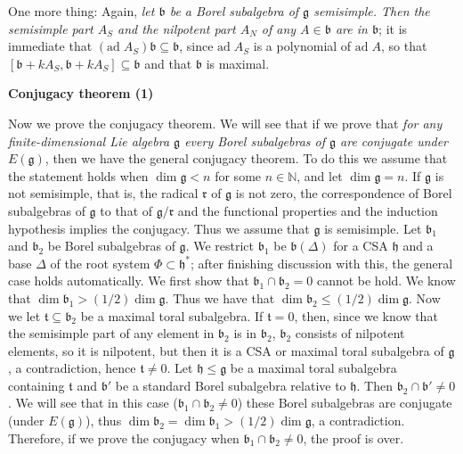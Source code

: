 \documentclass{article}
\newcommand{\NaN}{\mathbb{N}}
\newcommand{\lie}[1]{\mathfrak{#1}}
\newcommand{\ad}[1]{\mathrm{ad}\; #1}
\begin{document}
One more thing:
Again, \textit{let $\lie{b}$ be a Borel subalgebra of $\lie{g}$ semisimple.
Then the semisimple part $A_S$ and the nilpotent part $A_N$ of any $A \in \lie{b}$ are in $\lie{b}$}; it is immediate that $(\ad{A_S})\lie{b} \subseteq \lie{b}$, since $\ad{A_S}$ is a polynomial of $\ad{A}$, so that $[\lie{b} + kA_S, \lie{b} + kA_S] \subseteq \lie{b}$ and that $\lie{b}$ is maximal.

\newpage

\textbf{Conjugacy theorem (1)}

Now we prove the conjugacy theorem.
We will see that if we prove that \textit{for any finite-dimensional Lie algebra $\lie{g}$ every Borel subalgebras of $\lie{g}$ are conjugate under $E(\lie{g})$}, then we have the general conjugacy theorem.
To do this we assume that the statement holds when $\dim{\lie{g}} < n$ for some $n \in \NaN$, and let $\dim{\lie{g}} = n$.
If $\lie{g}$ is not semisimple, that is, the radical $\lie{r}$ of $\lie{g}$ is not zero, the correspondence of Borel subalgebras of $\lie{g}$ to that of $\lie{g}/\lie{r}$ and the functional properties and the induction hypothesis implies the conjugacy.
Thus we assume that $\lie{g}$ is semisimple.
Let $\lie{b}_1$ and $\lie{b}_2$ be Borel subalgebras of $\lie{g}$.
We restrict $\lie{b}_1$ be $\lie{b}(\Delta)$ for a CSA $\lie{h}$ and a base $\Delta$ of the root system $\Phi \subset \lie{h}^*$; after finishing discussion with this, the general case holds automatically.
We first show that $\lie{b}_1 \cap \lie{b}_2 = 0$ cannot be hold.
We know that $\dim{\lie{b}_1} > (1/2)\dim{\lie{g}}$.
Thus we have that $\dim{\lie{b}_2} \le (1/2)\dim{\lie{g}}$.
Now we let $\lie{t} \subseteq \lie{b}_2$ be a maximal toral subalgebra.
If $\lie{t} = 0$, then, since we know that the semisimple part of any element in $\lie{b}_2$ is in $\lie{b}_2$, $\lie{b}_2$ consists of nilpotent elements, so it is nilpotent, but then it is a CSA or maximal toral subalgebra of $\lie{g}$, a contradiction, hence $\lie{t} \ne 0$.
Let $\lie{h} \le \lie{g}$ be a maximal toral subalgebra containing $\lie{t}$ and $\lie{b}'$ be a standard Borel subalgebra relative to $\lie{h}$.
Then $\lie{b}_2 \cap \lie{b}' \ne 0$.
We will see that in this case ($\lie{b}_1 \cap \lie{b}_2 \ne 0$) these Borel subalgebras are conjugate (under $E(\lie{g})$), thus $\dim{\lie{b}_2} = \dim{\lie{b}_1} > (1/2)\dim{\lie{g}}$, a contradiction.
Therefore, if we prove the conjugacy when $\lie{b}_1 \cap \lie{b}_2 \ne 0$, the proof is over.
\end{document}
